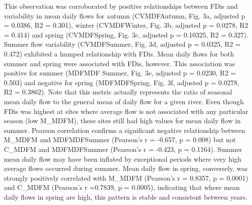 \documentclass[openright,12pt,a4paper]{memoir}
\begin{document}
This observation was corroborated by positive relationships between FDis and variability in mean daily flows for autumn (CVMDFAutumn, Fig. 3a, adjusted p = 0.0386, R2 = 0.301), winter (CVMDFWinter, Fig. 3b, adjusted p = 0.0278, R2 = 0.414) and spring (CVMDFSpring, Fig. 3c, adjusted p = 0.10325, R2 = 0.327). Summer flow variability (CVMDFSummer, Fig. 3d, adjusted p = 0.0325, R2 = 0.472) exhibited a humped relationship with FDis. Mean daily flows for both summer and spring were associated with FDis, however. This association was positive for summer (MDFMDF Summer, Fig. 3e, adjusted p = 0.0230, R2 = 0.503) and negative for spring (MDFMDFSpring, Fig. 3f, adjusted p = 0.0278, R2 = 0.3862).  Note that this metric actually represents the ratio of seasonal mean daily flow to the general mean of daily flow for a given river. Even though FDis was highest at sites where average flow is not associated with any particular season (low M\_MDFM), these sites still had high values for mean daily flow in summer. Pearson correlation confirms a significant negative relationship between M\_MDFM and MDFMDFSummer (Pearson’s r = -0.657, p = 0.008) but not C\_MDFM and MDFMDFSummer (Pearson’s r = -0.423, p = 0.1164). Summer mean daily flow may have been inflated by exceptional periods where very high average flows occurred during summer. Mean daily flow in spring, conversely, was strongly positively correlated with M\_MDFM (Pearson’s r = 0.8357, p = 0.0001) and C\_MDFM (Pearson’s r =0.7839, p = 0.0005), indicating that where mean daily flows in spring are high, this pattern is stable and consistent between years.
\end{document}
